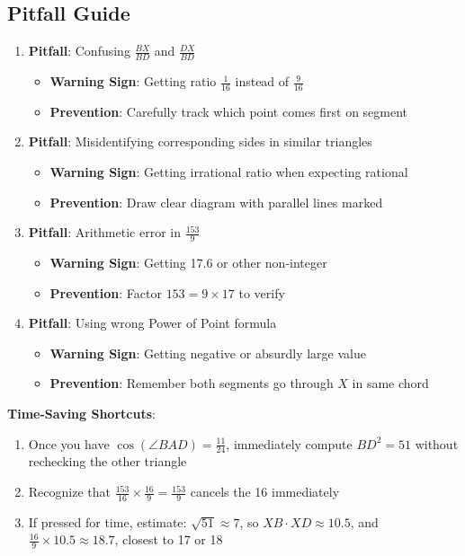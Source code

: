 \documentclass[]{article}
\begin{document}
\begin{solutionbox}
\subsection*{Pitfall Guide}
\begin{enumerate}[leftmargin=*]
    \item \textbf{Pitfall}: Confusing $\frac{BX}{BD}$ and $\frac{DX}{BD}$
    \begin{itemize}
        \item \textbf{Warning Sign}: Getting ratio $\frac{1}{16}$ instead of $\frac{9}{16}$
        \item \textbf{Prevention}: Carefully track which point comes first on segment
    \end{itemize}
    
    \item \textbf{Pitfall}: Misidentifying corresponding sides in similar triangles
    \begin{itemize}
        \item \textbf{Warning Sign}: Getting irrational ratio when expecting rational
        \item \textbf{Prevention}: Draw clear diagram with parallel lines marked
    \end{itemize}
    
    \item \textbf{Pitfall}: Arithmetic error in $\frac{153}{9}$
    \begin{itemize}
        \item \textbf{Warning Sign}: Getting 17.6 or other non-integer
        \item \textbf{Prevention}: Factor $153 = 9 \times 17$ to verify
    \end{itemize}
    
    \item \textbf{Pitfall}: Using wrong Power of Point formula
    \begin{itemize}
        \item \textbf{Warning Sign}: Getting negative or absurdly large value
        \item \textbf{Prevention}: Remember both segments go through $X$ in same chord
    \end{itemize}
\end{enumerate}
\end{solutionbox}

\begin{protipbox}
\textbf{Time-Saving Shortcuts}:
\begin{enumerate}
    \item Once you have $\cos(\angle BAD) = \frac{11}{24}$, immediately compute $BD^2 = 51$ without rechecking the other triangle
    \item Recognize that $\frac{153}{16} \times \frac{16}{9} = \frac{153}{9}$ cancels the 16 immediately
    \item If pressed for time, estimate: $\sqrt{51} \approx 7$, so $XB \cdot XD \approx 10.5$, and $\frac{16}{9} \times 10.5 \approx 18.7$, closest to 17 or 18
\end{enumerate}
\end{protipbox}
\end{document}
